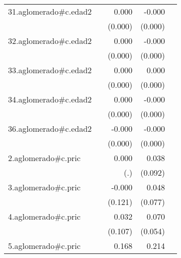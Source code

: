 {\begin{longtable}{l*{4}{D{.}{.}{-1}}}
\addlinespace
31.aglomerado#c.edad2&                     &       0.000         &      -0.000\sym{*}  &                     \\
            &                     &     (0.000)         &     (0.000)         &                     \\
\addlinespace
32.aglomerado#c.edad2&                     &       0.000         &      -0.000         &                     \\
            &                     &     (0.000)         &     (0.000)         &                     \\
\addlinespace
33.aglomerado#c.edad2&                     &       0.000         &       0.000         &                     \\
            &                     &     (0.000)         &     (0.000)         &                     \\
\addlinespace
34.aglomerado#c.edad2&                     &       0.000         &      -0.000         &                     \\
            &                     &     (0.000)         &     (0.000)         &                     \\
\addlinespace
36.aglomerado#c.edad2&                     &      -0.000         &      -0.000         &                     \\
            &                     &     (0.000)         &     (0.000)         &                     \\
\addlinespace
2.aglomerado#c.pric&                     &       0.000         &       0.038         &                     \\
            &                     &         (.)         &     (0.092)         &                     \\
\addlinespace
3.aglomerado#c.pric&                     &      -0.000         &       0.048         &                     \\
            &                     &     (0.121)         &     (0.077)         &                     \\
\addlinespace
4.aglomerado#c.pric&                     &       0.032         &       0.070         &                     \\
            &                     &     (0.107)         &     (0.054)         &                     \\
\addlinespace
5.aglomerado#c.pric&                     &       0.168         &       0.214\sym{**} &                     \\

\end{longtable}}
